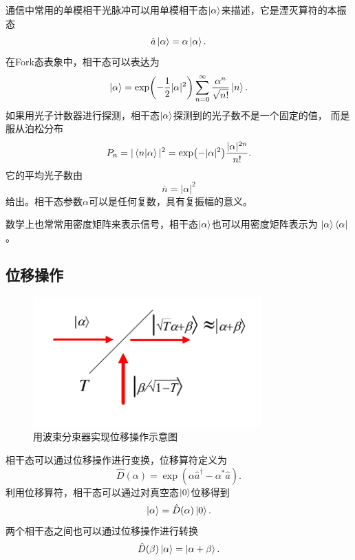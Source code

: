 通信中常用的单模相干光脉冲可以用单模相干态$\ket{\alpha}$来描述，它是湮灭算符的本振态
\begin{equation}
\hat{a} \ket{\alpha} = \alpha \ket{\alpha}.
\end{equation}
在Fork态表象中，相干态可以表达为
\begin{equation}
\ket{\alpha} = \exp(-\frac{1}{2}|\alpha|^2) \sum_{n=0}^\infty \frac{\alpha^n}{\sqrt{n!}} \ket{n}.
\end{equation}
如果用光子计数器进行探测，相干态$\ket{\alpha}$探测到的光子数不是一个固定的值，
而是服从泊松分布
\begin{equation}
P_n = |\bra{n}\ket{\alpha}|^2 = \exp(-|\alpha|^2) \frac{|\alpha|^{2n}}{n!} .
\end{equation}
它的平均光子数由
\begin{equation}
\bar{n} = |\alpha|^2
\end{equation}
给出。相干态参数${\alpha}$可以是任何复数，具有复振幅的意义\cite{glauber1963coherent}。

数学上也常常用密度矩阵来表示信号\cite{wt2001qm}，相干态$\ket{\alpha}$也可以用密度矩阵表示为
$\ket{\alpha}\bra{\alpha}$。



\subsection{位移操作}

\begin{figure}
\centering
  \includegraphics[height=5cm]{figures/chap2/displacement-operator}
  \caption{用波束分束器实现位移操作示意图}
  \label{fig:diaplacement}
\end{figure}

相干态可以通过位移操作进行变换，位移算符定义为\cite{glauber1963coherent,gerry2005introductory,helstrom1976quantum,mandel1995optical}
\begin{equation}
\hat{D}(\alpha) = \exp(\alpha \hat{a}^\dagger - \alpha^* \hat{a}).
\end{equation}
利用位移算符，相干态可以通过对真空态$\ket{0}$位移得到
\begin{equation}
\ket{\alpha} = \hat{D}(\alpha) \ket{0}.
\end{equation}
两个相干态之间也可以通过位移操作进行转换
\begin{equation}
\hat{D}(\beta) \ket{\alpha} = \ket{\alpha + \beta} .
\end{equation}


